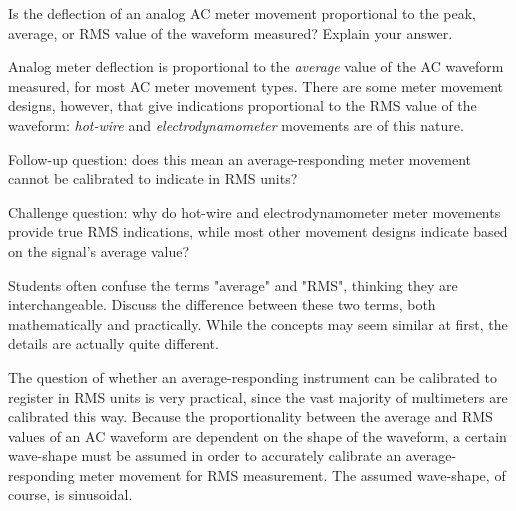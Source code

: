 

Is the deflection of an analog AC meter movement proportional to the peak, average, or RMS value of the waveform measured?  Explain your answer.







Analog meter deflection is proportional to the {\it average} value of the AC waveform measured, for most AC meter movement types.  There are some meter movement designs, however, that give indications proportional to the RMS value of the waveform: {\it hot-wire} and {\it electrodynamometer} movements are of this nature.

\vskip 10pt

Follow-up question: does this mean an average-responding meter movement cannot be calibrated to indicate in RMS units?

\vskip 10pt

Challenge question: why do hot-wire and electrodynamometer meter movements provide true RMS indications, while most other movement designs indicate based on the signal's average value?







Students often confuse the terms "average" and "RMS", thinking they are interchangeable.  Discuss the difference between these two terms, both mathematically and practically.  While the concepts may seem similar at first, the details are actually quite different.

The question of whether an average-responding instrument can be calibrated to register in RMS units is very practical, since the vast majority of multimeters are calibrated this way.  Because the proportionality between the average and RMS values of an AC waveform are dependent on the shape of the waveform, a certain wave-shape must be assumed in order to accurately calibrate an average-responding meter movement for RMS measurement.  The assumed wave-shape, of course, is sinusoidal.




